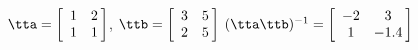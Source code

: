 {$\tta = \left[
\begin{array}{cc}
  1 & 2 \\
 1 & 1
\end{array} \hskip -3pt
\right]$, \quad
$\ttb = \left[
\begin{array}{cc}
 3 & 5 \\
 2 & 5
\end{array} \hskip -3pt
\right]$}
{$(\tta\ttb)^{-1} = \left[
\begin{array}{cc}
 -2 & 3 \\
 1 & -1.4
\end{array} \hskip -3pt
\right]$}
